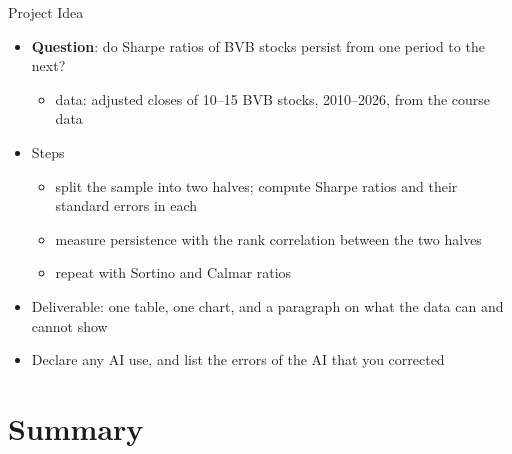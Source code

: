 \begin{frame}{Project Idea}
\itemsize{\small}
\begin{itemize}
    \item \textbf{Question}: do Sharpe ratios of BVB stocks persist from one period to the next?
    \begin{itemize}
        \item data: adjusted closes of 10--15 BVB stocks, 2010--2026, from the course data
    \end{itemize}
    \item Steps
    \begin{itemize}
        \item split the sample into two halves; compute Sharpe ratios and their standard errors in each
        \item measure persistence with the rank correlation between the two halves
        \item repeat with Sortino and Calmar ratios
    \end{itemize}
    \item Deliverable: one table, one chart, and a paragraph on what the data can and cannot show
    \item Declare any AI use, and list the errors of the AI that you corrected
\end{itemize}
\end{frame}


\section{Summary}

